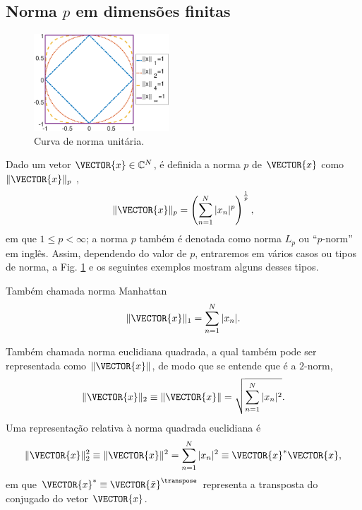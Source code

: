 \subsection{Norma $p$ em dimensões finitas} %
\label{subsec:pnorm}
\begin{figure}
     \centering
     \vspace{-15pt}
     \includegraphics[width=0.45\textwidth]{chapters/notacao/pnormcode.eps}
     \caption{Curva de norma unitária.}
     \label{fig:curvaunit}
     \vspace{-30pt}
\end{figure}
Dado um vetor $\VECTOR{x} \in \mathbb{C}^{N}$,
é definida a norma $p$ de $\VECTOR{x}$  como $\|\VECTOR{x}\|_p$ \cite[pp. 33]{vetterli2014foundations}, 
\begin{equation}
\|\VECTOR{x}\|_p=\left(\sum_{n=1}^N |x_n|^p\right)^{\frac{1}{p}},
\end{equation}
em que $1 \leq p < \infty$; a norma $p$
também é denotada como norma $L_p$ ou ``$p$-norm'' em inglês.
Assim, dependendo do valor de $p$, entraremos em vários casos ou tipos de norma,
a Fig. \ref{fig:curvaunit} e os seguintes exemplos mostram alguns desses tipos.

\begin{example}[Norma taxicab - $p=1$:] Também chamada norma Manhattan
\begin{equation}
\|\VECTOR{x}\|_1=\sum_{n=1}^N |x_n|.
\end{equation}
\end{example}

\begin{example}[Norma euclidiana - $p=2$:] Também chamada norma euclidiana quadrada, 
a qual também pode ser representada como $\|\VECTOR{x}\|$, 
de modo que se entende que é a $2$-norm,
\begin{equation}
\|\VECTOR{x}\|_2\equiv \|\VECTOR{x}\| =\sqrt{\sum_{n=1}^N |x_n|^2}.
\end{equation}
Uma representação relativa à norma quadrada euclidiana é
\begin{equation}
\|\VECTOR{x}\|_2^2\equiv \|\VECTOR{x}\|^2=\sum_{n=1}^N |x_n|^2\equiv \VECTOR{x}^{*} \VECTOR{x},
\end{equation}
em que $\VECTOR{x}^{*}\equiv \VECTOR{\bar{x}}^{\transpose}$ 
representa a transposta do conjugado do vetor  $\VECTOR{x}$. 
\end{example}

